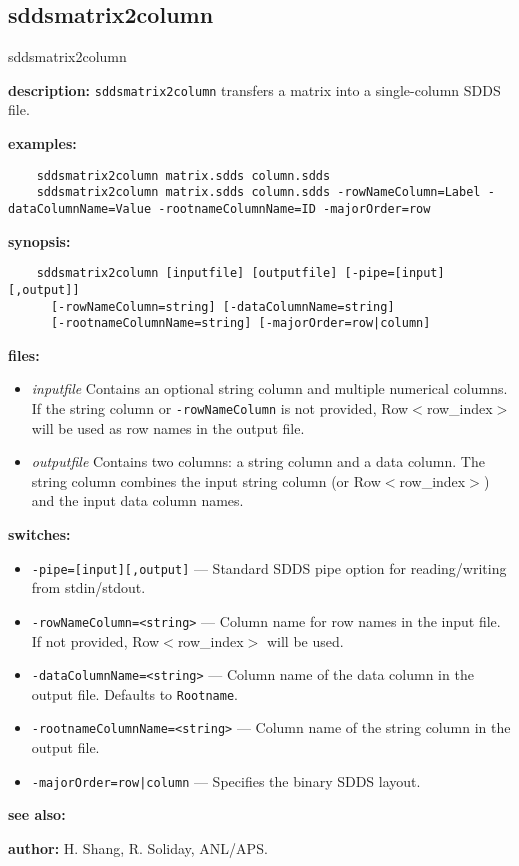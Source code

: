 \newpage
\subsection{sddsmatrix2column}
\label{sddsmatrix2column}

\begin{sddsprog}{sddsmatrix2column}
  \item {\bf description:} \verb|sddsmatrix2column| transfers a matrix into a single-column SDDS file.
  \item {\bf examples:}
    \begin{verbatim}
    sddsmatrix2column matrix.sdds column.sdds
    sddsmatrix2column matrix.sdds column.sdds -rowNameColumn=Label -dataColumnName=Value -rootnameColumnName=ID -majorOrder=row
    \end{verbatim}
  \item {\bf synopsis:}
    \begin{verbatim}
    sddsmatrix2column [inputfile] [outputfile] [-pipe=[input][,output]]
      [-rowNameColumn=string] [-dataColumnName=string]
      [-rootnameColumnName=string] [-majorOrder=row|column]
    \end{verbatim}
  \item {\bf files:}
    \begin{itemize}
      \item {\em inputfile} Contains an optional string column and multiple numerical columns. If the string column or \verb|-rowNameColumn| is not provided, Row$<$row\_index$>$ will be used as row names in the output file.
      \item {\em outputfile} Contains two columns: a string column and a data column. The string column combines the input string column (or Row$<$row\_index$>$) and the input data column names.
    \end{itemize}
  \item {\bf switches:}
    \begin{itemize}
      \item \verb|-pipe=[input][,output]| --- Standard SDDS pipe option for reading/writing from stdin/stdout.
      \item \verb|-rowNameColumn=<string>| --- Column name for row names in the input file. If not provided, Row$<$row\_index$>$ will be used.
      \item \verb|-dataColumnName=<string>| --- Column name of the data column in the output file. Defaults to \verb|Rootname|.
      \item \verb|-rootnameColumnName=<string>| --- Column name of the string column in the output file.
      \item \verb+-majorOrder=row|column+ --- Specifies the binary SDDS layout.
    \end{itemize}
  \item {\bf see also:} 
  \item {\bf author:} H. Shang, R. Soliday, ANL/APS.
\end{sddsprog}

